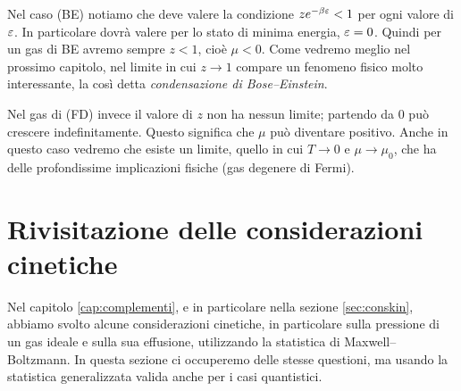Nel caso (BE) notiamo che deve valere la condizione $ze^{-\beta\varepsilon} < 1$ per ogni valore di $\varepsilon$. In particolare dovrà valere per lo stato di minima energia, $\varepsilon = 0$. Quindi per un gas di BE avremo sempre $z < 1$, cioè $\mu < 0$. Come vedremo meglio nel prossimo capitolo, nel limite in cui $z\to 1$ compare un fenomeno fisico molto interessante, la così detta {\em condensazione di Bose--Einstein}.

Nel gas di (FD) invece il valore di $z$ non ha nessun limite; partendo da $0$ può crescere indefinitamente. Questo significa che $\mu$ può diventare positivo. Anche in questo caso vedremo che esiste un limite, quello in cui $T\to 0$ e $\mu \to\mu_0$, che ha delle profondissime implicazioni fisiche (gas degenere di Fermi).

\section{Rivisitazione delle considerazioni cinetiche}
Nel capitolo \ref{cap:complementi}, e in particolare nella sezione \ref{sec:conskin}, abbiamo svolto alcune considerazioni cinetiche, in particolare sulla pressione di un gas ideale e sulla sua effusione, utilizzando la statistica di Maxwell--Boltzmann. In questa sezione ci occuperemo delle stesse questioni, ma usando la statistica generalizzata valida anche per i casi quantistici.


